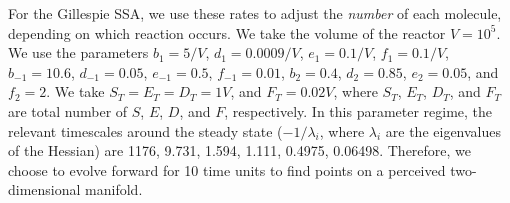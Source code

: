 \documentclass[aip,jcp,preprint]{revtex4-1}
\begin{document}
For the Gillespie SSA, we use these rates to adjust the {\em number} of each molecule, depending on which reaction occurs.
%
We take the volume of the reactor $V=10^5$.
%
We use the parameters $b_1=5/V$, $d_1=0.0009/V$, $e_1=0.1/V$, $f_1=0.1/V$, $b_{-1} = 10.6$, $d_{-1}=0.05$, $e_{-1}=0.5$, $f_{-1} =0.01$, $b_2=0.4$, $d_2=0.85$, $e_2=0.05$, and $f_2=2$.
%
We take $S_T=E_T=D_T=1V$, and $F_T=0.02V$, where $S_T$, $E_T$, $D_T$, and $F_T$ are total number of $S$, $E$, $D$, and $F$, respectively.
%
In this parameter regime, the relevant timescales around the steady state ($-1/\lambda_i$, where $\lambda_i$ are the eigenvalues of the Hessian) are 1176, 9.731, 1.594, 1.111, 0.4975, 0.06498.
%
Therefore, we choose to evolve forward for 10 time units to find points on a perceived two-dimensional manifold.
\end{document}
